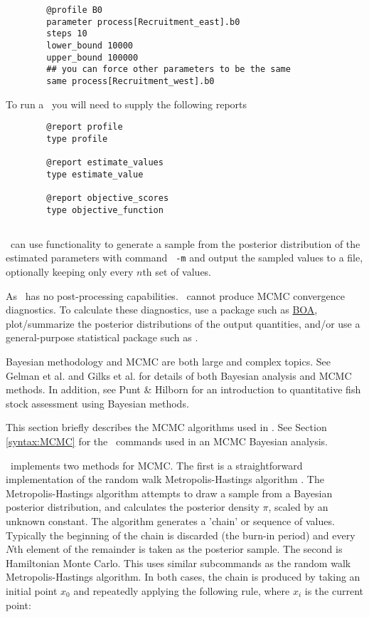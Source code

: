 {\small{\begin{verbatim}
		@profile B0
		parameter process[Recruitment_east].b0
		steps 10
		lower_bound 10000
		upper_bound 100000
		## you can force other parameters to be the same
		same process[Recruitment_west].b0
		\end{verbatim}}}
	
To run a \CNAME\ you will need to supply the following reports

{\small{\begin{verbatim}
		@report profile
		type profile
		
		@report estimate_values
		type estimate_value
		
		@report objective_scores
		type objective_function
\end{verbatim}}}
 


\subsection{}\label{sec:MCMC}\label{sec:MCMC-RandomWalkMetropolisHastings}

\CNAME\ can use  functionality to generate a sample from the posterior distribution of the estimated parameters with command \texttt{\cname\ -m} and output the sampled values to a file, optionally keeping only every $n$th set of values.

As \CNAME\ has no post-processing capabilities. \CNAME\ cannot produce MCMC convergence diagnostics. To calculate these diagnostics, use a package such as \href{http://www.public-health.uiowa.edu/boa}{BOA}, plot/summarize the posterior distributions of the output quantities, and/or use a general-purpose statistical package such as \href{http://www.r-project.org}{\R}.

Bayesian methodology and MCMC are both large and complex topics. See Gelman et al. \citeyearpar{823} and Gilks et al. \citeyearpar{143} for details of both Bayesian analysis and MCMC methods. In addition, see Punt \& Hilborn \citeyearpar{828} for an introduction to quantitative fish stock assessment using Bayesian methods.

This section briefly describes the MCMC algorithms used in \CNAME. See Section \ref{syntax:MCMC} for the \CNAME\ commands used in an MCMC Bayesian analysis.

\CNAME\ implements two methods for MCMC. The first is a straightforward implementation of the random walk Metropolis-Hastings algorithm \citep{823,143}. The Metropolis-Hastings algorithm attempts to draw a sample from a Bayesian posterior distribution, and calculates the posterior density $\pi$, scaled by an unknown constant. The algorithm generates a 'chain' or sequence of values. Typically the beginning of the chain is discarded (the burn-in period) and every $N$th element of the remainder is taken as the posterior sample. The second is Hamiltonian Monte Carlo. This uses similar subcommands as the random walk Metropolis-Hastings algorithm. In both cases, the chain is produced by taking an initial point $x_0$ and repeatedly applying the following rule, where $x_i$ is the current point:

